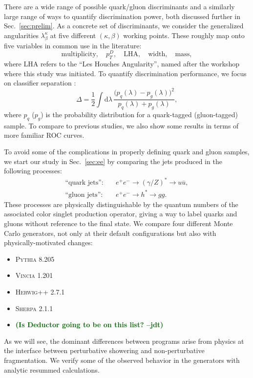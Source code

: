 \documentclass[11pt,letterpaper]{article}
\newcommand{\df}{\text{d}}
\DeclareRobustCommand{\Sec}[1]{Sec.~\ref{#1}}
\newcommand{\be}{\begin{equation}}
\newcommand{\ee}{\end{equation}}
\newcommand{\jdt}[1]{\textbf{\textcolor{darkgreen}{(#1 --jdt)}}}
\begin{document}
There are a wide range of possible quark/gluon discriminants and a similarly large range of ways to quantify discrimination power, both discussed further in  \Sec{sec:prelim}.  As a concrete set of discriminants, we consider the generalized angularities $\lambda_\beta^\kappa$ \cite{} at five different $(\kappa, \beta)$ working points.  These roughly map onto five variables in common use in the literature:
\be
\text{multiplicity}, \quad p_T^D, \quad \text{LHA}, \quad \text{width}, \quad \text{mass},
\ee
where LHA refers to the ``Les Houches Angularity'', named after the workshop where this study was initiated.  To quantify discrimination performance, we focus on classifier separation \cite{}:
\be
\Delta =  \frac{1}{2} \int \df \lambda \, \frac{\bigl(p_q(\lambda) - p_g(\lambda)\bigr)^2}{p_q(\lambda) + p_g(\lambda)},
\ee
where $p_q$ ($p_g$) is the probability distribution for a quark-tagged (gluon-tagged) sample.   To compare to previous studies, we also show some results in terms of more familiar ROC curves.

To avoid some of the complications in properly defining quark and gluon samples, we start our study in \Sec{sec:ee} by comparing the jets produced in the following processes:
\begin{align}
\text{``quark jets''}: \quad & e^+e^- \to (\gamma/Z)^* \to u \overline{u}, \\
\text{``gluon jets''}: \quad & e^+e^- \to h^* \to g g.
\end{align}
These processes are physically distinguishable by the quantum numbers of the associated color singlet production operator, giving a way to label quarks and gluons without reference to the final state.  We compare four different Monte Carlo generators, not only at their default configurations but also with physically-motivated changes:
\begin{itemize}
\item \textsc{Pythia 8.205} \cite{}
\item \textsc{Vincia 1.201} \cite{}
\item \textsc{Herwig++ 2.7.1} \cite{}
\item \textsc{Sherpa 2.1.1} \cite{}
\item \jdt{Is Deductor going to be on this list?}
\end{itemize}
As we will see, the dominant differences between programs arise from physics at the interface between perturbative showering and non-perturbative fragmentation.  We verify some of the observed behavior in the generators with analytic resummed calculations.
\end{document}
